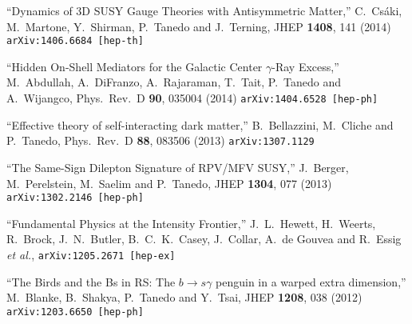\documentclass[margin,line]{resume}
\begin{document}
\begin{resume}
``Dynamics of 3D SUSY Gauge Theories with Antisymmetric Matter,''
  C.~Csáki, M.~Martone, Y.~Shirman, P.~Tanedo and J.~Terning,
  JHEP {\bf 1408}, 141 (2014)
\texttt{arXiv:1406.6684 [hep-th]} 

\vspace{-2mm}
 
``Hidden On-Shell Mediators for the Galactic Center $\gamma$-Ray Excess,''
  M.~Abdullah, A.~DiFranzo, A.~Rajaraman, T.~Tait, P.~Tanedo and A.~Wijangco,
  Phys.\ Rev.\ D {\bf 90}, 035004 (2014)
  \texttt{arXiv:1404.6528 [hep-ph]}

\vspace{-2mm}
 
``Effective theory of self-interacting dark matter,''
  B.~Bellazzini, M.~Cliche and P.~Tanedo,
  Phys.\ Rev.\ D {\bf 88}, 083506 (2013)
\texttt{arXiv:1307.1129} 

\vspace{-2mm}
 
``The Same-Sign Dilepton Signature of RPV/MFV SUSY,''
  J.~Berger, M.~Perelstein, M.~Saelim and P.~Tanedo,
  JHEP {\bf 1304}, 077 (2013)
\texttt{arXiv:1302.2146 [hep-ph]} 

\vspace{-2mm}
 
``Fundamental Physics at the Intensity Frontier,''
  J.~L.~Hewett, H.~Weerts, R.~Brock, J.~N.~Butler, B.~C.~K.~Casey, J.~Collar, A.~de Gouvea and R.~Essig {\it et al.},
\texttt{arXiv:1205.2671 [hep-ex]} 

\vspace{-2mm}
 
``The Birds and the Bs in RS: The $b \to s \gamma$ penguin in a warped extra dimension,''
  M.~Blanke, B.~Shakya, P.~Tanedo and Y.~Tsai,
  JHEP {\bf 1208}, 038 (2012)
\texttt{arXiv:1203.6650 [hep-ph]} 

\vspace{-2mm}
 

\end{resume}
\end{document}
